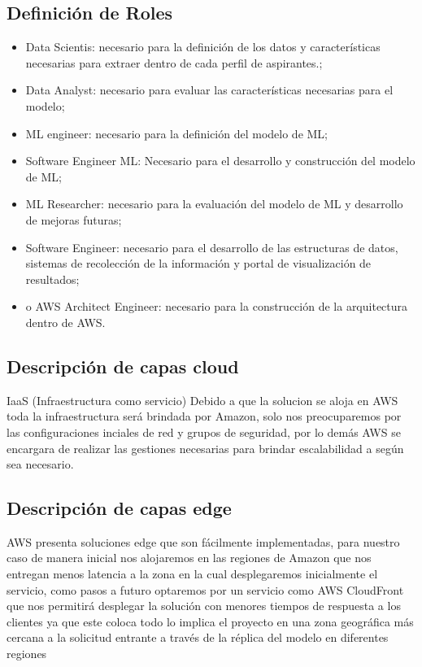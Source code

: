 \documentclass[a4paper]{jpconf}
\begin{document}
\subsection{Definición de Roles}
\begin{itemize}
\item Data Scientis: necesario para la definición de los datos y características necesarias para extraer dentro de cada perfil de aspirantes.;
\item Data Analyst: necesario para evaluar las características necesarias para el modelo;
\item ML engineer: necesario para la definición del modelo de ML; 
\item Software Engineer ML: Necesario para el desarrollo y construcción del modelo de ML;
\item ML Researcher: necesario para la evaluación del modelo de ML y desarrollo de mejoras futuras;
\item Software Engineer: necesario para el desarrollo de las estructuras de datos, sistemas de recolección de la información y portal de visualización de resultados;
\item o	AWS Architect Engineer: necesario para la construcción de la arquitectura dentro de AWS.
\end{itemize}


\subsection{Descripción de capas cloud}
IaaS (Infraestructura como servicio)
Debido a que la solucion se aloja en AWS toda la infraestructura será brindada por Amazon, solo nos preocuparemos por las configuraciones inciales de red y grupos de seguridad, por lo demás AWS se encargara de realizar las gestiones necesarias para brindar escalabilidad a según sea necesario.

\subsection{Descripción de capas edge}
AWS presenta  soluciones edge que son fácilmente implementadas, para nuestro caso de manera inicial nos alojaremos en las regiones de Amazon que nos entregan menos latencia a la zona en la cual desplegaremos inicialmente el servicio, como pasos a futuro optaremos por un servicio como AWS CloudFront  que  nos permitirá desplegar la solución con menores tiempos de respuesta a los clientes ya que este coloca todo lo implica el proyecto en una  zona geográfica más cercana a la solicitud entrante a través de la réplica del modelo en diferentes regiones
\end{document}
